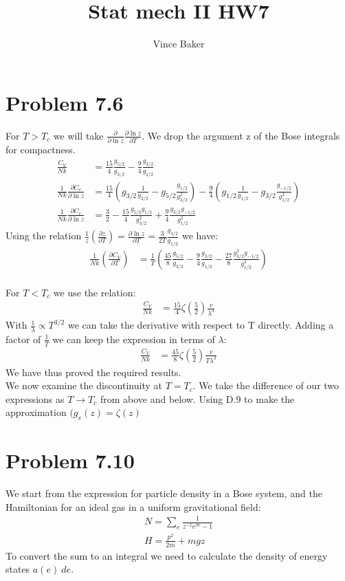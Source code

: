 \documentclass[a4paper,11pt]{article}
\title{Stat mech II HW7}
\author{Vince Baker}
\numberwithin{equation}{section}
\begin{document}
\maketitle

\section{Problem 7.6}
For $T>T_c$ we will take $\frac{\partial}{\partial \ln{z}}\frac{\partial \ln{z}}{\partial T}$.
We drop the argument z of the Bose integrals for compactness.
\begin{align}
 \frac{C_V}{Nk} &= \frac{15}{4}\frac{g_{5/2}}{g_{3/2}}-\frac{9}{4}\frac{g_{3/2}}{g_{1/2}}\\
 \frac{1}{Nk}\frac{\partial C_v}{\partial \ln{z}} &= \frac{15}{4}\left(g_{3/2}\frac{1}{g_{3/2}}-g_{5/2}\frac{g_{1/2}}{g_{3/2}^2} \right)
	-\frac{9}{4}\left(g_{1/2}\frac{1}{g_{1/2}}-g_{3/2}\frac{g_{-1/2}}{g_{1/2} ^2} \right)\\
  \frac{1}{Nk}\frac{\partial C_v}{\partial \ln{z}} &= \frac{3}{2}-\frac{15}{4}\frac{g_{5/2}g_{1/2}}{g_{3/2}^2}+\frac{9}{4}\frac{g_{3/2}g_{-1/2}}{g_{1/2}^2}
\end{align}
Using the relation $\frac{1}{z}\left(\frac{\partial z}{\partial T}\right)=\frac{\partial \ln{z}}{\partial T}=\frac{3}{2T}\frac{g_{3/2}}{g_{1/2}}$ we have:
\begin{align}
 \frac{1}{Nk}\left(\frac{\partial C_V}{\partial T} \right) &= \frac{1}{T}\left(\frac{45}{8}\frac{g_{5/2}}{g_{3/2}}-\frac{9}{4}\frac{g_{3/2}}{g_{1/2}}
      -\frac{27}{8}\frac{g_{3/2}^2g_{-1/2}}{g_{1/2}^3} \right)
\end{align}
\\
For $T<T_c$ we use the relation:
\begin{align}
 \frac{C_V}{Nk} &= \frac{15}{4}\zeta\left(\frac{5}{2}\right)\frac{v}{\lambda^3}
\end{align}
With $\frac{1}{\lambda} \propto T^{3/2}$ we can take the derivative with respect to T directly.
Adding a factor of $\frac{1}{T}$ we can keep the expression in terms of $\lambda$:
\begin{align}
 \frac{C_V}{Nk} &= \frac{45}{8}\zeta\left(\frac{5}{2}\right)\frac{v}{T\lambda^3}
\end{align}
We have thus proved the required results.
\\
We now examine the discontinuity at $T=T_c$. 
We take the difference of our two expressions as $T \rightarrow T_c$ from above and below.
Using D.9 to make the approximation $(g_v(z) = \zeta(z)$
\section{Problem 7.10}
We start from the expression for particle density in a Bose system, and the Hamiltonian for an ideal gas in a uniform gravitational field:
\begin{align}
 N = \sum_e \frac{1}{z^{-1}e^{\beta e}-1}\\
 H = \frac{p^2}{2m}+mgz
\end{align}
To convert the sum to an integral we need to calculate the density of energy states $a(e)\ de$.
\end{document}
